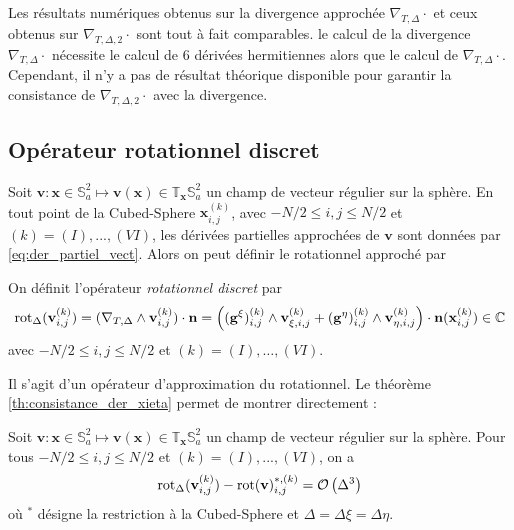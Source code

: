 Les résultats numériques obtenus sur la divergence approchée $\nabla_{T,\Delta} \cdot$ et ceux obtenus sur $\nabla_{T,\Delta,2} \cdot$ sont tout à fait comparables. le calcul de la divergence $\nabla_{T,\Delta} \cdot$ nécessite le calcul de 6 dérivées hermitiennes alors que le calcul de $\nabla_{T,\Delta} \cdot$. Cependant, il n'y a pas de résultat théorique disponible pour garantir la consistance de $\nabla_{T,\Delta,2} \cdot$ avec la divergence.























\subsection{Opérateur rotationnel discret}

Soit $\mathbf{v} : \mathbf{x} \in \mathbb{S}_a^2 \mapsto \mathbf{v}(\mathbf{x}) \in \mathbb{T}_{\mathbf{x}} \mathbb{S}_a^2$ un champ de vecteur régulier sur la sphère. En tout point de la Cubed-Sphere $\mathbf{x}_{i,j}^{(k)}$, avec $-N/2 \leq i,j \leq N/2$ et $(k) = (I), ..., (VI)$, les dérivées partielles approchées de $\mathbf{v}$ sont données par \eqref{eq:der_partiel_vect}. Alors on peut définir le rotationnel approché par 

\begin{definition}
On définit l'opérateur \textit{rotationnel discret} par 
\begin{equation}
\text{rot}_{\Delta} (\mathbf{v}_{i,j}^{(k)}) = (\nabla_{T,\Delta} \wedge \mathbf{v}_{i,j}^{(k)}) \cdot \mathbf{n} = \left( ( \mathbf{g}^{\xi} )_{i,j}^{(k)} \wedge \mathbf{v}_{\xi,i,j}^{(k)}   + ( \mathbf{g}^{\eta} )_{i,j}^{(k)} \wedge \mathbf{v}_{\eta,i,j}^{(k)} \right) \cdot \mathbf{n}(\mathbf{x}_{i,j}^{(k)}) \in \mathbb{C}
\end{equation}
avec $-N/2 \leq i,j \leq N/2$ et $(k) = (I), \ldots , (VI)$.
\label{def:rotationnel_disc}
\end{definition}

Il s'agit d'un opérateur d'approximation du rotationnel. Le théorème \ref{th:consistance_der_xieta} permet de montrer directement :

\begin{proposition}
Soit $\mathbf{v} : \mathbf{x} \in \mathbb{S}_a^2 \mapsto \mathbf{v}(\mathbf{x}) \in \mathbb{T}_{\mathbf{x}} \mathbb{S}_a^2$ un champ de vecteur régulier sur la sphère. Pour tous $-N/2 \leq i,j \leq N/2$ et $(k) = (I), ..., (VI)$, on a
\begin{equation}
\text{rot}_{\Delta}(\mathbf{v}_{i,j}^{(k)}) - \text{rot}(\mathbf{v})^{*,(k)}_{i,j} = \mathcal{O} \left( \Delta^3  \right) 
\end{equation}
où $^*$ désigne la restriction à la Cubed-Sphere et $\Delta = \Delta \xi = \Delta \eta$.
\end{proposition}

